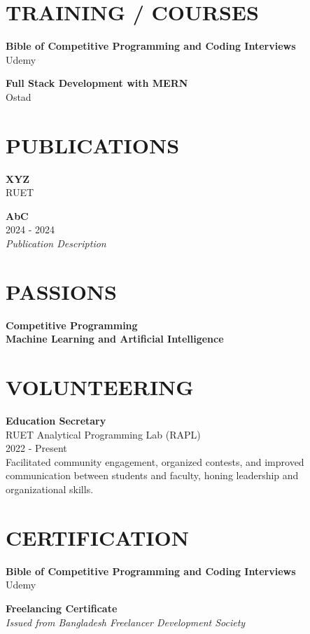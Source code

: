 \documentclass[a4paper,10pt]{article}
\begin{document}
\begin{multicols}{2}
\section*{TRAINING / COURSES}
\textbf{Bible of Competitive Programming and Coding Interviews} \\
Udemy

\textbf{Full Stack Development with MERN} \\
Ostad

\section*{PUBLICATIONS}
\textbf{XYZ} \\
RUET

\textbf{AbC} \\
2024 - 2024 \\
\textit{Publication Description}

\section*{PASSIONS}
\textbf{Competitive Programming} \\

\textbf{Machine Learning and Artificial Intelligence} \\

\section*{VOLUNTEERING}
\textbf{Education Secretary} \\
RUET Analytical Programming Lab (RAPL) \\
2022 - Present \\
Facilitated community engagement, organized contests, and improved communication between students and faculty, honing leadership and organizational skills.

\section*{CERTIFICATION}
\textbf{Bible of Competitive Programming and Coding Interviews} \\
Udemy

\textbf{Freelancing Certificate} \\
\textit{Issued from Bangladesh Freelancer Development Society}


\end{multicols}
\end{document}
